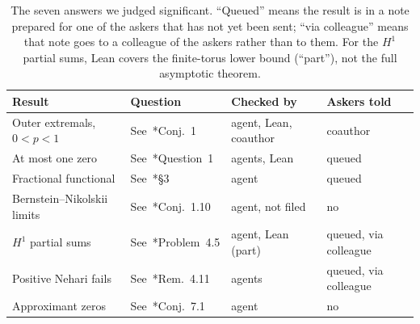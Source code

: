 \documentclass[11pt]{amsart}
\begin{document}
\begin{table}[ht]
  \centering
  \small
  \setlength{\tabcolsep}{4pt}
  \begin{tabular}{llll}
    \toprule
    Result                      & Question                                 & Checked by            & Askers told           \\
    \midrule
    Outer extremals, $0<p<1$    & See~\cite{brevigsaksman}*{Conj.~1}       & agent, Lean, coauthor & coauthor              \\
    At most one zero            & See~\cite{bgi}*{Question~1}              & agents, Lean          & queued                \\
    Fractional functional       & See~\cite{bbss}*{\S3}                    & agent                 & queued                \\
    Bernstein--Nikolskii limits & See~\cite{ganzburgtikhonov}*{Conj.~1.10} & agent, not filed      & no                    \\
    $H^1$ partial sums          & See~\cite{saksman-seip}*{Problem~4.5}    & agent, Lean (part)    & queued, via colleague \\
    Positive Nehari fails       & See~\cite{perfektpushnitski}*{Rem.~4.11} & agents                & queued, via colleague \\
    Approximant zeros           & See~\cite{centner}*{Conj.~7.1}           & agent                 & no                    \\
    \bottomrule
  \end{tabular}
  \caption{The seven answers we judged significant. ``Queued'' means the result is in a note
    prepared for one of the askers that has not yet been sent; ``via
    colleague'' means that note goes to a colleague of the askers rather than
    to them. For the $H^1$ partial sums, Lean covers the finite-torus lower
    bound (``part''), not the full asymptotic theorem.}\label{tab:six}
\end{table}
\end{document}
